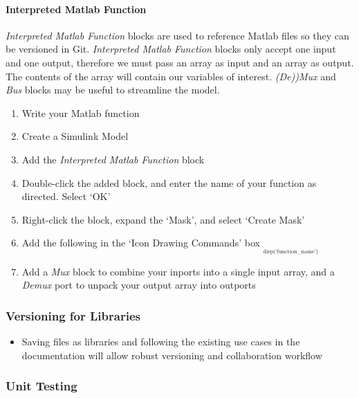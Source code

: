 \documentclass[]{article}
\providecommand{\tightlist}{%
  \setlength{\itemsep}{0pt}\setlength{\parskip}{0pt}}
\let\oldparagraph\paragraph
\renewcommand{\paragraph}[1]{\oldparagraph{#1}\mbox{}}
\begin{document}
\paragraph{Interpreted Matlab
Function}\label{interpreted-matlab-function}

\emph{Interpreted Matlab Function} blocks are used to reference Matlab
files so they can be versioned in Git. \emph{Interpreted Matlab
Function} blocks only accept one input and one output, therefore we must
pass an array as input and an array as output. The contents of the array
will contain our variables of interest. \emph{(De))Mux} and \emph{Bus}
blocks may be useful to streamline the model.

\begin{enumerate}
\def\labelenumi{\arabic{enumi}.}
\tightlist
\item
  Write your Matlab function
\item
  Create a Simulink Model
\item
  Add the \emph{Interpreted Matlab Function} block
\item
  Double-click the added block, and enter the name of your function as
  directed. Select `OK'
\item
  Right-click the block, expand the `Mask', and select `Create Mask'
\item
  Add the following in the `Icon Drawing Commands' box
  \textsubscript{\textsubscript{\textsubscript{ disp(`function\_name')
  }}}
\item
  Add a \emph{Mux} block to combine your inports into a single input
  array, and a \emph{Demux} port to unpack your output array into
  outports
\end{enumerate}

\subsubsection{Versioning for Libraries}\label{versioning-for-libraries}

\begin{itemize}
\tightlist
\item
  Saving files as libraries and following the existing use cases in the
  documentation will allow robust versioning and collaboration workflow
\end{itemize}

\subsubsection{Unit Testing}\label{unit-testing-1}
\end{document}
